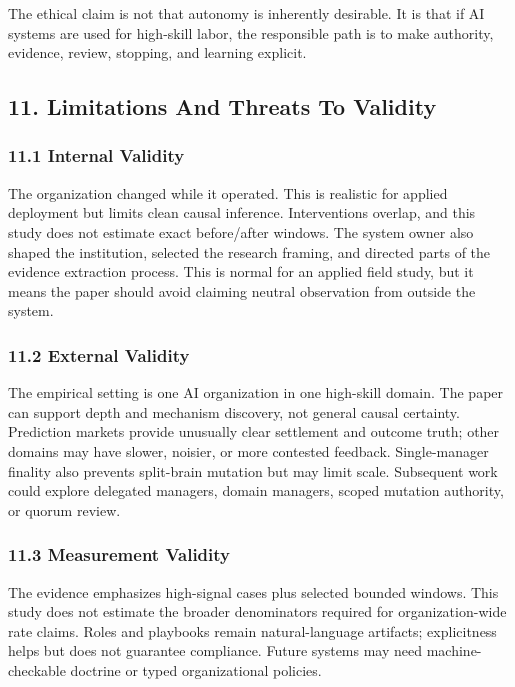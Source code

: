 \documentclass[
]{article}
\begin{document}
The ethical claim is not that autonomy is inherently desirable. It is that if AI systems are used for high-skill labor, the responsible path is to make authority, evidence, review, stopping, and learning explicit.

\subsection{11. Limitations And Threats To Validity}\label{limitations-and-threats-to-validity}

\subsubsection{11.1 Internal Validity}\label{internal-validity}

The organization changed while it operated. This is realistic for applied deployment but limits clean causal inference. Interventions overlap, and this study does not estimate exact before/after windows. The system owner also shaped the institution, selected the research framing, and directed parts of the evidence extraction process. This is normal for an applied field study, but it means the paper should avoid claiming neutral observation from outside the system.

\subsubsection{11.2 External Validity}\label{external-validity}

The empirical setting is one AI organization in one high-skill domain. The paper can support depth and mechanism discovery, not general causal certainty. Prediction markets provide unusually clear settlement and outcome truth; other domains may have slower, noisier, or more contested feedback. Single-manager finality also prevents split-brain mutation but may limit scale. Subsequent work could explore delegated managers, domain managers, scoped mutation authority, or quorum review.

\subsubsection{11.3 Measurement Validity}\label{measurement-validity}

The evidence emphasizes high-signal cases plus selected bounded windows. This study does not estimate the broader denominators required for organization-wide rate claims. Roles and playbooks remain natural-language artifacts; explicitness helps but does not guarantee compliance. Future systems may need machine-checkable doctrine or typed organizational policies.
\end{document}
